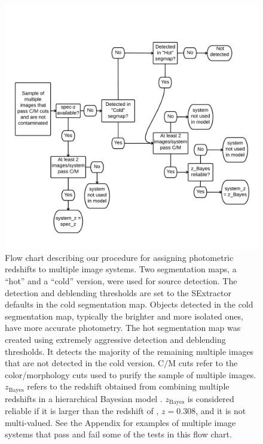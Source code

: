 \begin{figure}
    \centering
    \includegraphics[width=\textwidth]{fig/Photo-z_flow_chart.pdf}
    \caption[Flow chart describing our procedure for assigning photometric redshifts to multiple image
    systems.]{Flow chart describing our procedure for assigning photometric redshifts to multiple image systems.
    Two segmentation maps, a ``hot'' and a ``cold'' version, were used for source detection. The detection and
    deblending thresholds are set to the SExtractor defaults in the cold segmentation map. Objects detected in
    the cold segmentation map, typically the brighter and more isolated ones, have more accurate photometry. The
    hot segmentation map was created using extremely aggressive detection and deblending thresholds. It detects
    the majority of the remaining multiple images that are not detected in the cold version.
    $\textrm{C}/\textrm{M}$ cuts refer to the color/morphology cuts used to purify the sample of multiple images.
    $z_{\mathrm{Bayes}}$ refers to the redshift obtained from combining multiple redshifts in a hierarchical
    Bayesian model \citep{Dahlen:2013p33380}. $z_{\mathrm{Bayes}}$ is considered reliable if it is larger than
    the redshift of \cler, $z=0.308$, and it is not multi-valued. See the Appendix for examples of multiple image
    systems that pass and fail some of the tests in this flow chart. }
    \label{fig:flow_chart}
\end{figure} 


